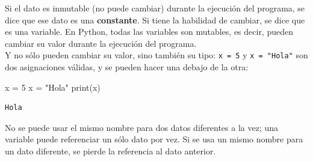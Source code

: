 \documentclass[
  letterpaper,
  DIV=11,
  numbers=noendperiod]{scrreprt}
\newenvironment{Shaded}{\begin{snugshade}}{\end{snugshade}}
\newcommand{\BuiltInTok}[1]{\textcolor[rgb]{0.00,0.23,0.31}{#1}}
\newcommand{\DecValTok}[1]{\textcolor[rgb]{0.68,0.00,0.00}{#1}}
\newcommand{\NormalTok}[1]{\textcolor[rgb]{0.00,0.23,0.31}{#1}}
\newcommand{\OperatorTok}[1]{\textcolor[rgb]{0.37,0.37,0.37}{#1}}
\newcommand{\StringTok}[1]{\textcolor[rgb]{0.13,0.47,0.30}{#1}}
\begin{document}
\begin{tcolorbox}[enhanced jigsaw, colframe=quarto-callout-note-color-frame, opacityback=0, opacitybacktitle=0.6, bottomrule=.15mm, toprule=.15mm, coltitle=black, breakable, colback=white, leftrule=.75mm, titlerule=0mm, bottomtitle=1mm, toptitle=1mm, rightrule=.15mm, title=\textcolor{quarto-callout-note-color}{\faInfo}\hspace{0.5em}{Variables y Constantes}, arc=.35mm, left=2mm, colbacktitle=quarto-callout-note-color!10!white]

Si el dato es inmutable (no puede cambiar) durante la ejecución del
programa, se dice que ese dato es una \textbf{constante}. Si tiene la
habilidad de cambiar, se dice que es una variable. En Python, todas las
variables son mutables, es decir, pueden cambiar su valor durante la
ejecución del programa.\\
Y no sólo pueden cambiar su valor, sino también su tipo:
\texttt{x\ =\ 5} y \texttt{x\ =\ "Hola"} son dos asignaciones válidas, y
se pueden hacer una debajo de la otra:

\begin{Shaded}
\begin{Highlighting}[]
\NormalTok{x }\OperatorTok{=} \DecValTok{5}
\NormalTok{x }\OperatorTok{=} \StringTok{"Hola"}
\BuiltInTok{print}\NormalTok{(x)}
\end{Highlighting}
\end{Shaded}

\begin{verbatim}
Hola
\end{verbatim}

\end{tcolorbox}

\begin{tcolorbox}[enhanced jigsaw, colframe=quarto-callout-warning-color-frame, opacityback=0, opacitybacktitle=0.6, bottomrule=.15mm, toprule=.15mm, coltitle=black, breakable, colback=white, leftrule=.75mm, titlerule=0mm, bottomtitle=1mm, toptitle=1mm, rightrule=.15mm, title=\textcolor{quarto-callout-warning-color}{\faExclamationTriangle}\hspace{0.5em}{Nombres de Variables}, arc=.35mm, left=2mm, colbacktitle=quarto-callout-warning-color!10!white]

No se puede usar el mismo nombre para dos datos diferentes a la vez; una
variable puede referenciar un sólo dato por vez. Si se usa un mismo
nombre para un dato diferente, se pierde la referencia al dato
anterior.\\

\end{tcolorbox}
\end{document}
